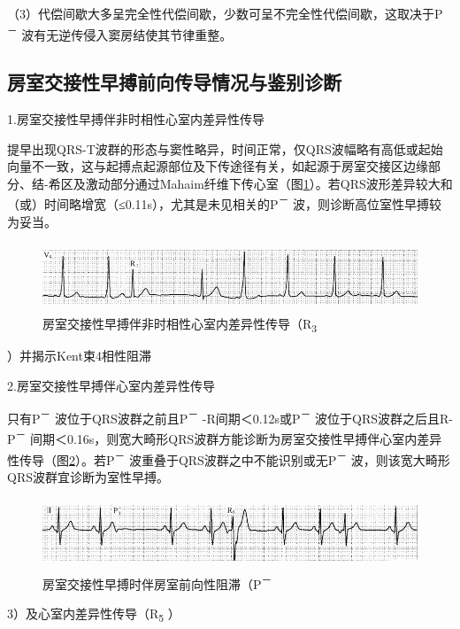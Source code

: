 （3）代偿间歇大多呈完全性代偿间歇，少数可呈不完全性代偿间歇，这取决于P\textsuperscript{－}
波有无逆传侵入窦房结使其节律重整。

\protect\hypertarget{text00018.htmlux5cux23subid146}{}{}

\subsection{房室交接性早搏前向传导情况与鉴别诊断}

1.房室交接性早搏伴非时相性心室内差异性传导

提早出现QRS-T波群的形态与窦性略异，时间正常，仅QRS波幅略有高低或起始向量不一致，这与起搏点起源部位及下传途径有关，如起源于房室交接区边缘部分、结-希区及激动部分通过Mahaim纤维下传心室（图\ref{fig11-16}）。若QRS波形差异较大和（或）时间略增宽（≤0.11s），尤其是未见相关的P\textsuperscript{－}
波，则诊断高位室性早搏较为妥当。

\begin{figure}[!htbp]
 \centering
 \includegraphics[width=5.58333in,height=0.80208in]{./images/Image00176.jpg}
 \captionsetup{justification=centering}
 \caption{房室交接性早搏伴非时相性心室内差异性传导（R\textsubscript{3}}
 \label{fig11-16}
  \end{figure} 
）并揭示Kent束4相性阻滞

2.房室交接性早搏伴心室内差异性传导

只有P\textsuperscript{－} 波位于QRS波群之前且P\textsuperscript{－}
-R间期＜0.12s或P\textsuperscript{－}
波位于QRS波群之后且R-P\textsuperscript{－}
间期＜0.16s，则宽大畸形QRS波群方能诊断为房室交接性早搏伴心室内差异性传导（图\ref{fig11-17}）。若P\textsuperscript{－}
波重叠于QRS波群之中不能识别或无P\textsuperscript{－}
波，则该宽大畸形QRS波群宜诊断为室性早搏。

\begin{figure}[!htbp]
 \centering
 \includegraphics[width=5.58333in,height=0.82292in]{./images/Image00177.jpg}
 \captionsetup{justification=centering}
 \caption{房室交接性早搏时伴房室前向性阻滞（P\textsuperscript{－}}
 \label{fig11-17}
  \end{figure} 
3）及心室内差异性传导（R\textsubscript{5} ）

